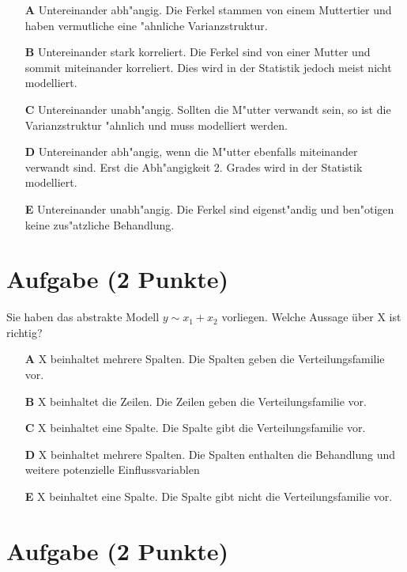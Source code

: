 \documentclass[a4paper, 10pt]{scrartcl}\usepackage[]{graphicx}\usepackage[]{xcolor}
\begin{document}
\begin{enumerate}
\item [\textbf{A} \msquare] Untereinander abh{"a}ngig. Die Ferkel stammen von einem Muttertier und haben vermutliche eine {"a}hnliche Varianzstruktur.
\item [\textbf{B} \msquare] Untereinander stark korreliert. Die Ferkel sind von einer Mutter und sommit miteinander korreliert. Dies wird in der Statistik jedoch meist nicht modelliert.
\item [\textbf{C} \msquare] Untereinander unabh{"a}ngig. Sollten die M{"u}tter verwandt sein, so ist die Varianzstruktur {"a}hnlich und muss modelliert werden.
\item [\textbf{D} \msquare] Untereinander abh{"a}ngig, wenn die M{"u}tter ebenfalls miteinander verwandt sind. Erst die Abh{"a}ngigkeit 2. Grades wird in der Statistik modelliert.
\item [\textbf{E} \msquare] Untereinander unabh{"a}ngig. Die Ferkel sind eigenst{"a}ndig und ben{"o}tigen keine zus{"a}tzliche Behandlung.
\end{enumerate}

\section{Aufgabe \hfill (2 Punkte)}




Sie haben das abstrakte Modell $y \sim x_1 + x_2$ vorliegen. Welche Aussage {\"u}ber
X ist richtig?



\begin{enumerate}
\item [\textbf{A} \msquare] X beinhaltet mehrere Spalten. Die Spalten geben die Verteilungsfamilie vor.
\item [\textbf{B} \msquare] X beinhaltet die Zeilen. Die Zeilen geben die Verteilungsfamilie vor.
\item [\textbf{C} \msquare] X beinhaltet eine Spalte. Die Spalte gibt die Verteilungsfamilie vor.
\item [\textbf{D} \msquare] X beinhaltet mehrere Spalten. Die Spalten enthalten die Behandlung und weitere potenzielle Einflussvariablen
\item [\textbf{E} \msquare] X beinhaltet eine Spalte. Die Spalte gibt nicht die Verteilungsfamilie vor.
\end{enumerate}

\section{Aufgabe \hfill (2 Punkte)}
\end{document}
